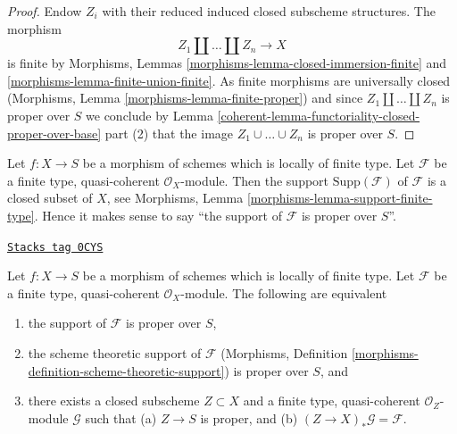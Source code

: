 \begin{proof}

Endow $Z_i$ with their reduced induced closed subscheme structures.
The morphism
$$
Z_1 \amalg \ldots \amalg Z_n \longrightarrow X
$$
is finite by Morphisms, Lemmas
\ref{morphisms-lemma-closed-immersion-finite} and
\ref{morphisms-lemma-finite-union-finite}.
As finite morphisms are universally closed
(Morphisms, Lemma \ref{morphisms-lemma-finite-proper})
and since $Z_1 \amalg \ldots \amalg Z_n$ is proper over $S$
we conclude by
Lemma \ref{coherent-lemma-functoriality-closed-proper-over-base} part (2)
that the image $Z_1 \cup \ldots \cup Z_n$ is proper over $S$.
\end{proof}

Let $f : X \to S$ be a morphism of schemes which is locally
of finite type. Let $\mathcal{F}$ be a finite type, quasi-coherent
$\mathcal{O}_X$-module. Then the support $\text{Supp}(\mathcal{F})$
of $\mathcal{F}$ is a closed subset of $X$, see
Morphisms, Lemma \ref{morphisms-lemma-support-finite-type}.
Hence it makes sense to say
``the support of $\mathcal{F}$ is proper over $S$''.

\begin{lemma}
\label{coherent-lemma-module-support-proper-over-base}
\href{https://stacks.math.columbia.edu/tag/0CYS}{\texttt{Stacks tag 0CYS}}

Let $f : X \to S$ be a morphism of schemes which is locally
of finite type. Let $\mathcal{F}$ be a finite type, quasi-coherent
$\mathcal{O}_X$-module. The following are equivalent
\begin{enumerate}
\item the support of $\mathcal{F}$ is proper over $S$,
\item the scheme theoretic support of $\mathcal{F}$
(Morphisms, Definition \ref{morphisms-definition-scheme-theoretic-support})
is proper over $S$, and
\item there exists a closed subscheme $Z \subset X$ and
a finite type, quasi-coherent $\mathcal{O}_Z$-module
$\mathcal{G}$ such that (a) $Z \to S$ is proper, and (b)
$(Z \to X)_*\mathcal{G} = \mathcal{F}$.
\end{enumerate}
\end{lemma}

